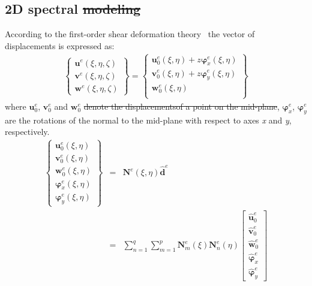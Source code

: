 \documentclass[materials,article,submit,moreauthors,pdftex]{Definitions/mdpi}
\providecommand{\DIFadd}[1]{{\protect\color{blue}{#1}}} %
\providecommand{\DIFdel}[1]{{\protect\color{red}\sout{#1}}}                      %
\providecommand{\DIFaddbegin}{} %
\providecommand{\DIFaddend}{} %
\providecommand{\DIFdelbegin}{} %
\providecommand{\DIFdelend}{} %
\begin{document}
\subsection{2D spectral \DIFdelbegin \DIFdel{modeling}\DIFdelend \DIFaddbegin \DIFadd{modelling}\DIFaddend }
\label{sec:2D_SEM}

According to the first-order shear deformation theory~\cite{reissner1945effect, mindlin1951influence} the vector of displacements is expressed as:
\begin{eqnarray}
\DIFdelbegin %
\DIFdelend \DIFaddbegin \left \{ \DIFaddend \begin{array}{c}
\textbf{u}^e(\xi,\eta,\zeta) \\
\textbf{v}^e(\xi,\eta,\zeta) \\
\textbf{w}^e(\xi,\eta,\zeta)
\end{array} \DIFdelbegin %
\DIFdelend \DIFaddbegin \right\} \DIFaddend = 
\DIFdelbegin %
\DIFdelend \DIFaddbegin \left \{ \DIFaddend \begin{array}{c}
\textbf{u}_0^e(\xi,\eta) + z\boldsymbol{\varphi}_x^e(\xi,\eta)\\
\textbf{v}_0^e(\xi,\eta) + z\boldsymbol{\varphi}_y^e(\xi,\eta)\\
\textbf{w}_0^e(\xi,\eta) \\
\end{array} \DIFdelbegin %
\DIFdelend \DIFaddbegin \right\}
\DIFaddend \end{eqnarray}
where \(\textbf{u}_0^e\), \(\textbf{v}_0^e\) and \(\textbf{w}_0^e\) \DIFdelbegin \DIFdel{denote the displacementsof a point on the mid-plane}\DIFdelend \DIFaddbegin \DIFadd{are nodal displacements}\DIFaddend , \(\boldsymbol{\varphi}_x^e\), \(\boldsymbol{\varphi}_y^e\) are the rotations of the normal to the mid-plane with respect to axes \textit{x} and \textit{y}, respectively.
\begin{eqnarray}
\DIFdelbegin %
\DIFdelend \DIFaddbegin \left \{\DIFaddend \begin{array}{c}
\textbf{u}_0^e(\xi,\eta) \\
\textbf{v}_0^e(\xi,\eta) \\
\textbf{w}_0^e(\xi,\eta) \\
\boldsymbol{\varphi}_x^e(\xi,\eta) \\
\boldsymbol{\varphi}_y^e(\xi,\eta)
\end{array} \DIFdelbegin %
\DIFdelend \DIFaddbegin \right\}
\DIFaddend & = & \textbf{N}^e(\xi,\eta)\widehat{\textbf{d}}^e\nonumber\\
& = & \sum_{n=1}^q\sum_{m=1}^p\textbf{N}_m^e(\xi)\textbf{N}_n^e(\eta)
\left [ \begin{array}{c}
\widehat{\textbf{u}}_0^e \\
\widehat{\textbf{v}}_0^e \\
\widehat{\textbf{w}}_0^e \\
\widehat{\boldsymbol{\varphi}}_x^e \\
\widehat{\boldsymbol{\varphi}}_y^e
\end{array} \right]
\end{eqnarray}
\end{document}

